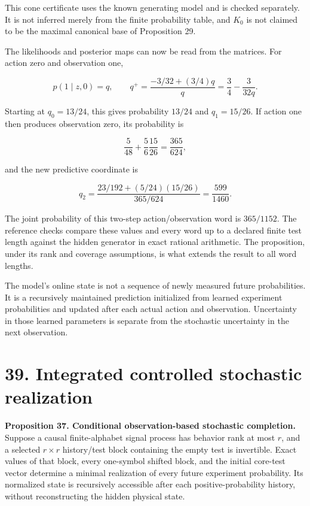 \documentclass[11pt,letterpaper]{article}
\begin{document}
This cone certificate uses the known generating model and is checked
separately. It is not inferred merely from the finite probability table,
and \(K_0\) is not claimed to be the maximal canonical base of
Proposition 29.

The likelihoods and posterior maps can now be read from the matrices.
For action zero and observation one,

\[
p(1\mid z,0)=q,\qquad
q^+=\frac{-3/32+(3/4)q}{q}
=\frac34-\frac{3}{32q}.
\]

Starting at \(q_0=13/24\), this gives probability \(13/24\) and
\(q_1=15/26\). If action one then produces observation zero, its
probability is

\[
\frac5{48}+\frac56\frac{15}{26}=\frac{365}{624},
\]

and the new predictive coordinate is

\[
q_2=\frac{23/192+(5/24)(15/26)}{365/624}=\frac{599}{1460}.
\]

The joint probability of this two-step action/observation word is
\(365/1152\). The reference checks compare these values and every word
up to a declared finite test length against the hidden generator in
exact rational arithmetic. The proposition, under its rank and coverage
assumptions, is what extends the result to all word lengths.

The model's online state is not a sequence of newly measured future
probabilities. It is a recursively maintained prediction initialized
from learned experiment probabilities and updated after each actual
action and observation. Uncertainty in those learned parameters is
separate from the stochastic uncertainty in the next observation.

\section{39. Integrated controlled stochastic
realization}\label{integrated-controlled-stochastic-realization}

\textbf{Proposition 37. Conditional observation-based stochastic
completion.} Suppose a causal finite-alphabet signal process has
behavior rank at most \(r\), and a selected \(r\times r\) history/test
block containing the empty test is invertible. Exact values of that
block, every one-symbol shifted block, and the initial core-test vector
determine a minimal realization of every future experiment probability.
Its normalized state is recursively accessible after each
positive-probability history, without reconstructing the hidden physical
state.
\end{document}
